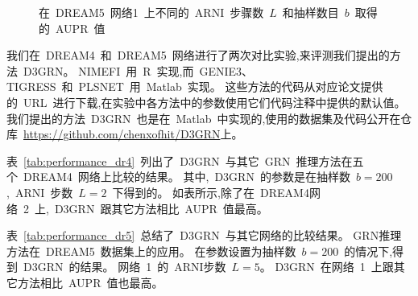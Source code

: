 \begin{figure}[!htbp]
\centering

\caption{
在~DREAM5~网络1~上不同的~ARNI~步骤数~$L$~和抽样数目~$b$~取得的~AUPR~值}

\label{fig:performance_dr5}
\end{figure}

我们在~DREAM4~和~DREAM5~网络进行了两次对比实验,来评测我们提出的方法~D3GRN。
NIMEFI~用~R~实现,而~GENIE3、TIGRESS~和~PLSNET~用~Matlab~实现。
这些方法的代码从对应论文提供的~URL~进行下载,在实验中各方法中的参数使用它们代码注释中提供的默认值。
我们提出的方法~D3GRN~也是在~Matlab~中实现的,使用的数据集及代码公开在仓库~\url{https://github.com/chenxofhit/D3GRN}上。

表~\ref{tab:performance_dr4}~列出了~D3GRN~与其它~GRN~推理方法在五个~DREAM4~网络上比较的结果。
其中,~D3GRN~的参数是在抽样数~$b=200$,~ARNI~步数~$L=2$~下得到的。
如表所示,除了在~DREAM4网络~2~上,~D3GRN~跟其它方法相比~AUPR~值最高。

表~\ref{tab:performance_dr5}~总结了~D3GRN~与其它网络的比较结果。
GRN推理方法在~DREAM5~数据集上的应用。
在参数设置为抽样数~$b=200$~的情况下,得到~D3GRN~的结果。
网络~1~的~ARNI步数~$L=5$。
D3GRN~在网络~1~上跟其它方法相比~AUPR~值也最高。

